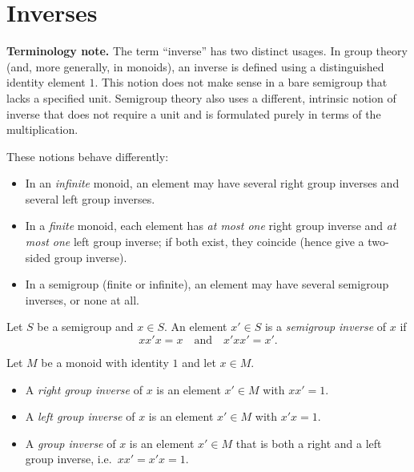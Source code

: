
\section{Inverses}

\noindent\textbf{Terminology note.}
The term “inverse” has two distinct usages. In group theory (and, more generally, in monoids), an inverse is defined using a distinguished identity element \(1\). This notion does not make sense in a bare semigroup that lacks a specified unit. Semigroup theory also uses a different, intrinsic notion of inverse that does not require a unit and is formulated purely in terms of the multiplication.

These notions behave differently:
\begin{itemize}
  \item In an \emph{infinite} monoid, an element may have several right group inverses and several left group inverses.
  \item In a \emph{finite} monoid, each element has \emph{at most one} right group inverse and \emph{at most one} left group inverse; if both exist, they coincide (hence give a two-sided group inverse).
  \item In a semigroup (finite or infinite), an element may have several semigroup inverses, or none at all.
\end{itemize}

\begin{definition}
\label{def:semigroup-inverse}
Let \(S\) be a semigroup and \(x\in S\). An element \(x'\in S\) is a \emph{semigroup inverse} of \(x\) if
\[
x x' x = x \quad\text{and}\quad x' x x' = x'.
\]
\end{definition}

\begin{definition}
\label{def:group-inverse}
Let \(M\) be a monoid with identity \(1\) and let \(x\in M\).
\begin{itemize}
  \item A \emph{right group inverse} of \(x\) is an element \(x'\in M\) with \(x x' = 1\).
  \item A \emph{left group inverse} of \(x\) is an element \(x'\in M\) with \(x' x = 1\).
  \item A \emph{group inverse} of \(x\) is an element \(x'\in M\) that is both a right and a left group inverse, i.e.\ \(x x' = x' x = 1\).
\end{itemize}
\end{definition}

